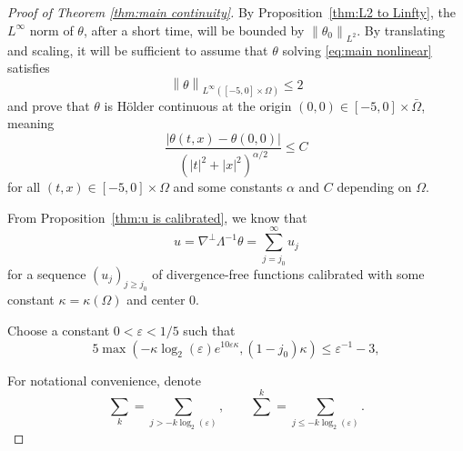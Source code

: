 \documentclass[11pt]{amsart}
\theoremstyle{remark}
\theoremstyle{definition}
\newcommand{\eps}{\varepsilon}
\newcommand{\norm}[1]{\left\lVert#1\right\rVert}
\newcommand{\paren}[1]{\left( #1 \right)}
\newcommand{\grad}{\nabla}
\newcommand{\n}{^{-1}}
\begin{document}
\begin{proof}[Proof of Theorem \ref{thm:main continuity}]
By Proposition~\ref{thm:L2 to Linfty}, the $L^\infty$ norm of $\theta$, after a short time, will be bounded by $\norm{\theta_0}_{L^2}$.  By translating and scaling, it will be sufficient to assume that $\theta$ solving \eqref{eq:main nonlinear} satisfies
\[ \norm{\theta}_{L^\infty([-5,0] \times \Omega)} \leq 2 \]
and prove that $\theta$ is H\"{o}lder continuous at the origin $(0,0) \in [-5,0]\times\bar{\Omega}$, meaning
\[ \frac{|\theta(t,x) - \theta(0,0)|}{\paren{|t|^2 + |x|^2}^{\alpha/2}} \leq C \]
for all $(t,x) \in [-5,0]\times\Omega$ and some constants $\alpha$ and $C$ depending on $\Omega$.  


From Proposition~\ref{thm:u is calibrated}, we know that 
\[ u = \grad^\perp \Lambda^{-1} \theta = \sum_{j=j_0}^\infty u_j \]
for a sequence $(u_j)_{j\geq j_0}$ of divergence-free functions calibrated with some constant $\kappa = \kappa(\Omega)$ and center 0.  

Choose a constant $0 < \eps < 1/5$ such that
\begin{equation}\label{eps is small enough for Cgamma} 
5 \max\paren{ - \kappa \log_2(\eps) e^{10\eps\kappa}, (1-j_0) \kappa} \leq \eps\n - 3,
\end{equation}


For notational convenience, denote
\[ \sum_k = \sum_{j > - k \log_2(\eps)}, \qquad \sum^k = \sum_{j \leq -k \log_2(\eps)}. \]


\end{proof}
\end{document}
